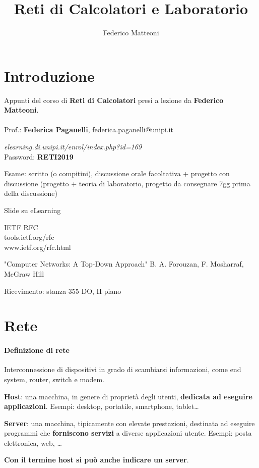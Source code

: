 \documentclass[10pt]{article}
\begin{document}
\title{Reti di Calcolatori e Laboratorio}
\author{Federico Matteoni}
\date{ }
\renewcommand*\contentsname{Indice}

\maketitle
\tableofcontents
\pagebreak
\section{Introduzione}
Appunti del corso di \textbf{Reti di Calcolatori} presi a lezione da \textbf{Federico Matteoni}.\\\\
Prof.: \textbf{Federica Paganelli}, federica.paganelli@unipi.it\\
\begin{list}{-}{Riferimenti web:}
\item \emph{elearning.di.unipi.it/enrol/index.php?id=169}\\Password: \textbf{RETI2019}
\end{list}
Esame: scritto (o compitini), discussione orale facoltativa + progetto con discussione (progetto + teoria di laboratorio, progetto da consegnare 7gg prima della discussione)\\
\begin{list}{-}{Libri e materiale didattico:}
\item Slide su eLearning
\item IETF RFC\\tools.ietf.org/rfc\\www.ietf.org/rfc.html
\item "Computer Networks: A Top-Down Approach" B. A. Forouzan, F. Mosharraf, McGraw Hill
\end{list}
Ricevimento: stanza 355 DO, II piano

\section{Rete}
\paragraph{Definizione di rete} Interconnessione di dispositivi in grado di scambiarsi informazioni, come end system, router, switch e modem.\\
\begin{list}{}{Gli end system possono essere di due tipi:}
\item \textbf{Host}: una macchina, in genere di proprietà degli utenti, \textbf{dedicata ad eseguire applicazioni}. Esempi: desktop, portatile, smartphone, tablet\ldots
\item \textbf{Server}: una macchina, tipicamente con elevate prestazioni, destinata ad eseguire programmi che \textbf{forniscono servizi} a diverse applicazioni utente. Esempi: posta elettronica, web, \ldots
\end{list}
\textbf{Con il termine host si può anche indicare un server}.
\end{document}
